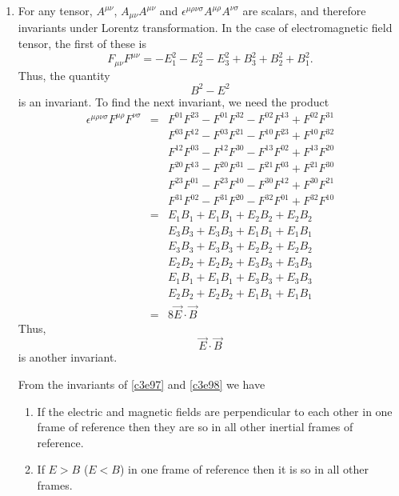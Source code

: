 \begin{enumerate}
\item For any tensor, $A^{\mu\nu}$, $A_{\mu\nu}A^{\mu\nu}$ and 
$\epsilon^{\mu\rho\nu\sigma}A^{\mu\rho}A^{\nu\sigma}$ are scalars, and therefore
invariants under Lorentz transformation. In the case of electromagnetic field
tensor, the first of these is
\[
F_{\mu\nu}F^{\mu\nu} = -E_1^2 - E_2^2 - E_3^2 + B_3^2 + B_2^2 + B_1^2.
\]
Thus, the quantity 
\begin{equation}\label{c3e98}
B^2 - E^2
\end{equation}
is an invariant. To find the next invariant, we
need the product
\begin{eqnarray*}
\epsilon^{\mu\rho\nu\sigma}F^{\mu\rho}F^{\nu\sigma} &=& F^{01}F^{23} - F^{01}F^{32} - F^{02}F^{13} + F^{02}F^{31} \\
 & & F^{03}F^{12} - F^{03}F^{21} - F^{10}F^{23} + F^{10}F^{32} \\
 & & F^{12}F^{03} - F^{12}F^{30} - F^{13}F^{02} + F^{13}F^{20} \\
 & & F^{20}F^{13} - F^{20}F^{31} - F^{21}F^{03} + F^{21}F^{30} \\
 & & F^{23}F^{01} - F^{23}F^{10} - F^{30}F^{12} + F^{30}F^{21} \\
 & & F^{31}F^{02} - F^{31}F^{20} - F^{32}F^{01} + F^{32}F^{10} \\
 &=& E_1B_1 + E_1B_1 + E_2B_2 + E_2B_2 \\
 & & E_3B_3 + E_3B_3 + E_1B_1 + E_1B_1 \\
 & & E_3B_3 + E_3B_3 + E_2B_2 + E_2B_2 \\
 & & E_2B_2 + E_2B_2 + E_3B_3 + E_3B_3 \\
 & & E_1B_1 + E_1B_1 + E_3B_3 + E_3B_3 \\
 & & E_2B_2 + E_2B_2 + E_1B_1 + E_1B_1 \\
 &=& 8\vec{E}\cdot\vec{B}
\end{eqnarray*}
Thus, \begin{equation}\label{c3e99}
\vec{E}\cdot\vec{B}
\end{equation}
is another invariant.

From the invariants of \eqref{c3e97} and \eqref{c3e98} we have
\begin{enumerate}
\item If the electric and magnetic fields are
perpendicular to each other in one frame of reference then they are so in all 
other inertial frames of reference.

\item If $E > B$ ($E < B$) in one frame of reference then it is so in all other
frames.


\end{enumerate}
\end{enumerate}
